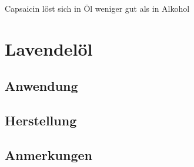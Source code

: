 Capsaicin löst sich in Öl weniger gut als in Alkohol




\section{Lavendelöl}

\subsection{Anwendung}

\subsection{Herstellung}

\subsection{Anmerkungen}

